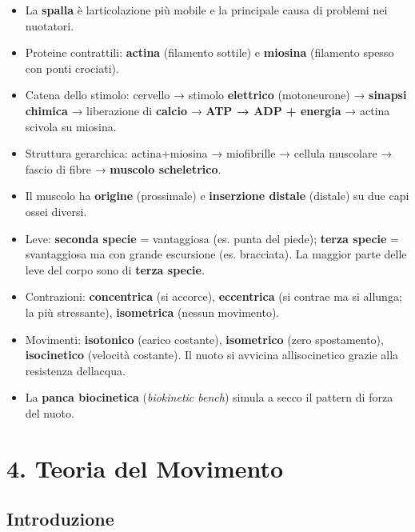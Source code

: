 \documentclass[a4paper,11pt]{article}
\begin{document}
\begin{itemize}
            (motori).
      \item
            La \textbf{spalla} è l\textquotesingle articolazione più mobile e la
            principale causa di problemi nei nuotatori.
      \item
            Proteine contrattili: \textbf{actina} (filamento sottile) e
            \textbf{miosina} (filamento spesso con ponti crociati).
      \item
            Catena dello stimolo: cervello → stimolo \textbf{elettrico}
            (motoneurone) → \textbf{sinapsi chimica} → liberazione di
            \textbf{calcio} → \textbf{ATP → ADP + energia} → actina scivola su
            miosina.
      \item
            Struttura gerarchica: actina+miosina → miofibrille → cellula muscolare
            → fascio di fibre → \textbf{muscolo scheletrico}.
      \item
            Il muscolo ha \textbf{origine} (prossimale) e \textbf{inserzione
                  distale} (distale) su due capi ossei diversi.
      \item
            Leve: \textbf{seconda specie} = vantaggiosa (es. punta del piede);
            \textbf{terza specie} = svantaggiosa ma con grande escursione (es.
            bracciata). La maggior parte delle leve del corpo sono di
            \textbf{terza specie}.
      \item
            Contrazioni: \textbf{concentrica} (si accorce), \textbf{eccentrica}
            (si contrae ma si allunga; la più stressante), \textbf{isometrica}
            (nessun movimento).
      \item
            Movimenti: \textbf{isotonico} (carico costante), \textbf{isometrico}
            (zero spostamento), \textbf{isocinetico} (velocità costante). Il nuoto
            si avvicina all\textquotesingle isocinetico grazie alla resistenza
            dell\textquotesingle acqua.
      \item
            La \textbf{panca biocinetica} (\emph{biokinetic bench}) simula a secco
            il pattern di forza del nuoto.
\end{itemize}

\section{4. Teoria del Movimento}\label{teoria-del-movimento}

\subsection{Introduzione}\label{introduzione-3}
\end{document}
